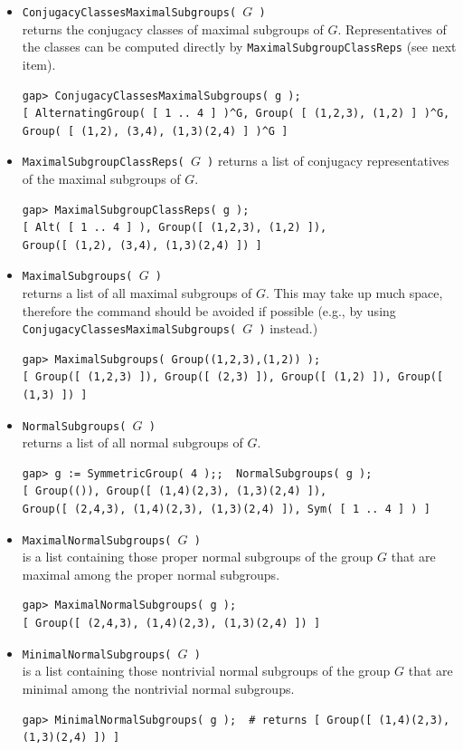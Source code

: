 \begin{itemize}
\item {\tt ConjugacyClassesMaximalSubgroups( $G$ )}\\
returns the conjugacy classes of maximal subgroups of $G$. Representatives of the
classes can be computed directly by {\tt MaximalSubgroupClassReps} (see next item).
{\codesize
\begin{verbatim}
gap> ConjugacyClassesMaximalSubgroups( g );
[ AlternatingGroup( [ 1 .. 4 ] )^G, Group( [ (1,2,3), (1,2) ] )^G,
Group( [ (1,2), (3,4), (1,3)(2,4) ] )^G ]
\end{verbatim}}

\item {\tt MaximalSubgroupClassReps( $G$ )}
returns a list of conjugacy representatives of the maximal subgroups of $G$.
{\codesize
\begin{verbatim}
gap> MaximalSubgroupClassReps( g );
[ Alt( [ 1 .. 4 ] ), Group([ (1,2,3), (1,2) ]),
Group([ (1,2), (3,4), (1,3)(2,4) ]) ]
\end{verbatim}}

\item {\tt MaximalSubgroups( $G$ )}\\
returns a list of all maximal subgroups of $G$. This may take up much space, therefore the command should
be avoided if possible (e.g., by using {\tt ConjugacyClassesMaximalSubgroups( $G$ )}
instead.)
{\codesize
\begin{verbatim}
gap> MaximalSubgroups( Group((1,2,3),(1,2)) );
[ Group([ (1,2,3) ]), Group([ (2,3) ]), Group([ (1,2) ]), Group([ (1,3) ]) ]
\end{verbatim}}

\item {\tt NormalSubgroups( $G$ )}\\
returns a list of all normal subgroups of $G$.
{\codesize
\begin{verbatim}
gap> g := SymmetricGroup( 4 );;  NormalSubgroups( g );
[ Group(()), Group([ (1,4)(2,3), (1,3)(2,4) ]),
Group([ (2,4,3), (1,4)(2,3), (1,3)(2,4) ]), Sym( [ 1 .. 4 ] ) ]
\end{verbatim}}

\item {\tt MaximalNormalSubgroups( $G$ )}\\
is a list containing those proper normal subgroups of the group $G$ that are maximal among the proper
normal subgroups.
{\codesize
\begin{verbatim}
gap> MaximalNormalSubgroups( g );
[ Group([ (2,4,3), (1,4)(2,3), (1,3)(2,4) ]) ]
\end{verbatim}}

\item {\tt MinimalNormalSubgroups( $G$ )}\\
is a list containing those nontrivial normal subgroups of the group $G$ that are minimal among the nontrivial
normal subgroups.
{\codesize
\begin{verbatim}
gap> MinimalNormalSubgroups( g );  # returns [ Group([ (1,4)(2,3), (1,3)(2,4) ]) ]
\end{verbatim}}
\end{itemize}
\subsectionspace

